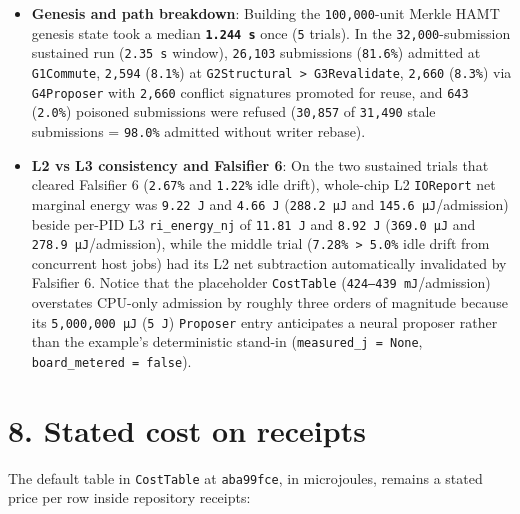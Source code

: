 \documentclass[10pt,letterpaper]{article}
\providecommand{\tightlist}{\setlength{\itemsep}{1pt}\setlength{\parskip}{0pt}}
\begin{document}
\begin{itemize}
\tightlist
\item
  \textbf{Genesis and path breakdown}: Building the
  \texttt{100,000}-unit Merkle HAMT genesis state took a median
  \textbf{\texttt{1.244\ s}} once (\texttt{5} trials). In the
  \texttt{32,000}-submission sustained run (\texttt{2.35\ s} window),
  \texttt{26,103} submissions (\texttt{81.6\%}) admitted at
  \texttt{G1Commute}, \texttt{2,594} (\texttt{8.1\%}) at
  \texttt{G2Structural\ \textgreater{}\ G3Revalidate}, \texttt{2,660}
  (\texttt{8.3\%}) via \texttt{G4Proposer} with \texttt{2,660} conflict
  signatures promoted for reuse, and \texttt{643} (\texttt{2.0\%})
  poisoned submissions were refused (\texttt{30,857} of \texttt{31,490}
  stale submissions = \texttt{98.0\%} admitted without writer rebase).
\item
  \textbf{L2 vs L3 consistency and Falsifier 6}: On the two sustained
  trials that cleared Falsifier 6 (\texttt{2.67\%} and \texttt{1.22\%}
  idle drift), whole-chip L2 \texttt{IOReport} net marginal energy was
  \texttt{9.22\ J} and \texttt{4.66\ J} (\texttt{288.2\ µJ} and
  \texttt{145.6\ µJ}/admission) beside per-PID L3
  \texttt{ri\_energy\_nj} of \texttt{11.81\ J} and \texttt{8.92\ J}
  (\texttt{369.0\ µJ} and \texttt{278.9\ µJ}/admission), while the
  middle trial (\texttt{7.28\%\ \textgreater{}\ 5.0\%} idle drift from
  concurrent host jobs) had its L2 net subtraction automatically
  invalidated by Falsifier 6. Notice that the placeholder
  \texttt{CostTable} (\texttt{424–439\ mJ}/admission) overstates
  CPU-only admission by roughly three orders of magnitude because its
  \texttt{5,000,000\ µJ} (\texttt{5\ J}) \texttt{Proposer} entry
  anticipates a neural proposer rather than the example's deterministic
  stand-in (\texttt{measured\_\allowbreak{}j\ =\ None},
  \texttt{board\_\allowbreak{}metered\ =\ false}).
\end{itemize}

\section{8. Stated cost on receipts}\label{stated-cost-on-receipts}

The default table in \texttt{CostTable} at \texttt{aba99fce}, in
microjoules, remains a stated price per row inside repository receipts:
\end{document}
